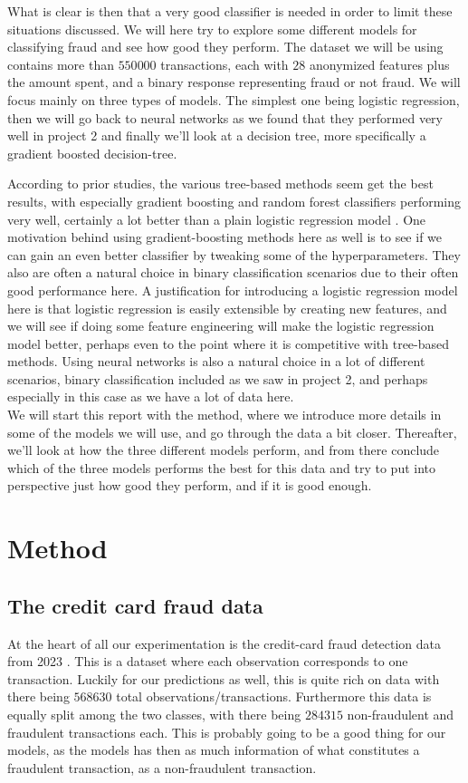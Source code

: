 \documentclass{article}
\begin{document}
What is clear is then that a very good classifier is needed in order to limit
these situations discussed. We will here try to explore some different models
for classifying fraud and see how good they perform. The dataset we will be
using contains more than $550 000$ transactions, each with $28$ anonymized
features plus the amount spent, and a binary response representing fraud or not
fraud. We will focus mainly on three types of models. The simplest one being
logistic regression, then we will go back to neural networks as we found that
they performed very well in project 2 \cite{githubrepoproject2} and finally
we'll look at a decision tree, more specifically a gradient boosted
decision-tree.

According to prior studies, the various tree-based methods seem
get the best results, with especially gradient boosting and random forest
classifiers performing very well, certainly a lot better than a plain logistic
regression model \cite[s.~Model Performance Conclusions]{kaggle100paccuracy}.
One motivation behind using gradient-boosting methods here as well is to see if
we can gain an even better classifier by tweaking some of the hyperparameters.
They also are often a natural choice in binary classification scenarios due to
their often good performance here.  A justification for introducing a logistic
regression model here is that logistic regression is easily extensible by
creating new features, and we will see if doing some feature engineering will
make the logistic regression model better, perhaps even to the point where it is
competitive with tree-based methods. Using neural networks is also a natural
choice in a lot of different scenarios, binary classification included as we saw
in project 2, and perhaps especially in this case as we have a lot of data here.
\\

We will start this report with the method, where we introduce more details in
some of the models we will use, and go through the data a bit closer.
Thereafter, we'll look at how the three different models perform, and from there
conclude which of the three models performs the best for this data and try to
put into perspective just how good they perform, and if it is good enough.

\section{Method}
\subsection{The credit card fraud data}
\label{methoddata}
At the heart of all our experimentation is the credit-card fraud detection
data from 2023 \cite{kaggleccdata}. This is a dataset where each observation
corresponds to one transaction. Luckily for our predictions as well, this is
quite rich on data with there being $568630$ total observations/transactions.
Furthermore this data is equally split among the two classes, with there being
$284315$ non-fraudulent and fraudulent transactions each. This is probably
going to be a good thing for our models, as the models has then as much
information of what constitutes a fraudulent transaction, as a non-fraudulent
transaction.
\end{document}
